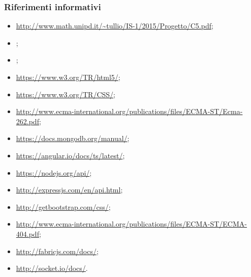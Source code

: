 \documentclass[a4paper, titlepage]{article}
\begin{document}
	\subsubsection{Riferimenti informativi}
	\begin{itemize}
		\item {}  \newline \url{http://www.math.unipd.it/~tullio/IS-1/2015/Progetto/C5.pdf};
		
		\item {} \Gldoc;
		
		\item {} \AdRdoc;
		
		\item {} \newline \url{https://www.w3.org/TR/html5/};
		
		\item {} \newline \url{https://www.w3.org/TR/CSS/};
		
		\item {} \newline \url{http://www.ecma-international.org/publications/files/ECMA-ST/Ecma-262.pdf};
		
		\item {} \newline \url{https://docs.mongodb.org/manual/};
		
		\item {} \newline \url{https://angular.io/docs/ts/latest/};
		
		\item {} \newline \url{https://nodejs.org/api/};
		
		\item {} \newline \url{http://expressjs.com/en/api.html};
		
		\item {} \newline \url{http://getbootstrap.com/css/};
		
		\item {} \newline \url{http://www.ecma-international.org/publications/files/ECMA-ST/ECMA-404.pdf};
		
		\item {} \newline \url{http://fabricjs.com/docs/};
		
		\item {} \newline \url{http://socket.io/docs/}.
		
	\end{itemize}
		
\end{document}
